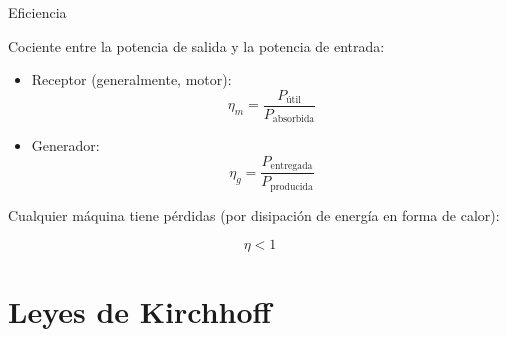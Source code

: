 \documentclass[aspectratio=169, xcolor={usenames,svgnames,dvipsnames}]{beamer}
\begin{document}
\begin{frame}{Eficiencia}
    
    Cociente entre la potencia de salida y la potencia de entrada:
    \begin{itemize}
        \item \alert{Receptor} (generalmente, motor):
    \begin{equation*}
      \eta_m = \frac{P_{\textrm{útil}}}{P_{\textrm{absorbida}}}
    \end{equation*}
    
    \item \alert{Generador}:
    \begin{equation*}
      \eta_g = \frac{P_{\textrm{entregada}}}{P_{\textrm{producida}}}
    \end{equation*}
    \end{itemize}

    \vspace{4mm}
    \alert{Cualquier máquina tiene pérdidas} (por disipación de energía en forma de calor):
    
    \begin{equation*}
      \boxed{\eta < 1}
    \end{equation*}
\end{frame}


\section{Leyes de Kirchhoff}
\end{document}
